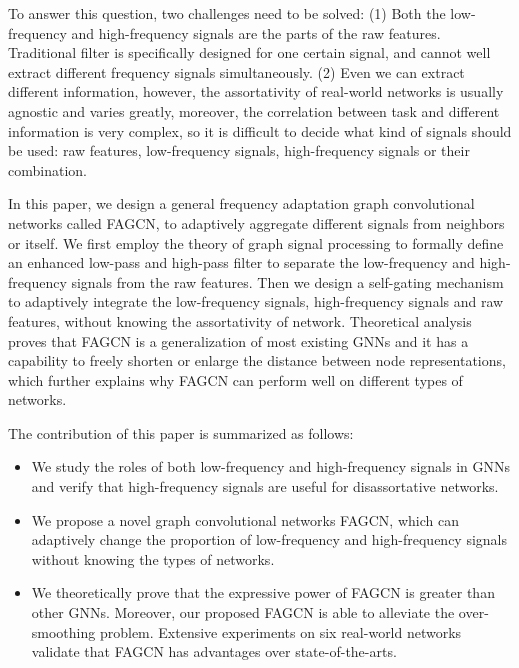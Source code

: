 \documentclass[letterpaper]{article} \usepackage{aaai21}  \usepackage{times}  \usepackage{helvet} \usepackage{courier}  \usepackage[hyphens]{url}  \usepackage{graphicx} \urlstyle{rm} \def\UrlFont{\rm}  \usepackage{natbib}  \usepackage{caption} \frenchspacing  \setlength{\pdfpagewidth}{8.5in}  \setlength{\pdfpageheight}{11in}
\begin{document}
To answer this question, two challenges need to be solved:
(1) Both the low-frequency and high-frequency signals are the parts of the raw features. Traditional filter is specifically designed for one certain signal, and cannot well extract different frequency signals  simultaneously.
(2) Even we can extract different information, however, the assortativity of real-world networks is usually agnostic and varies greatly, moreover, the correlation between task and different information is very complex, so it is difficult to decide what kind of signals should be used: raw features, low-frequency signals, high-frequency signals or their combination.

















In this paper, we design a general frequency adaptation graph convolutional networks called FAGCN, to adaptively aggregate different signals from neighbors or itself.
We first employ the theory of graph signal processing to formally define an enhanced low-pass and high-pass filter to separate the low-frequency and high-frequency signals from the raw features.
Then we design a self-gating mechanism to adaptively integrate the low-frequency signals, high-frequency signals and raw features, without knowing the assortativity of network. 
Theoretical analysis proves that FAGCN is a generalization of most existing GNNs and it has a capability to freely shorten or enlarge the distance between node representations, which further explains why FAGCN can perform well on different types of networks.









The contribution of this paper is summarized as follows:
\begin{itemize}
	\item We study the roles of both low-frequency and high-frequency signals in GNNs and verify that high-frequency signals are useful for disassortative networks.
	\item We propose a novel graph convolutional networks FAGCN, which can adaptively change the proportion of low-frequency and high-frequency signals without knowing the types of networks.
	\item We theoretically prove that the expressive power of FAGCN is greater than other GNNs. Moreover, our proposed FAGCN is able to alleviate the over-smoothing problem. Extensive experiments on six real-world networks validate that FAGCN has advantages over state-of-the-arts.
\end{itemize}
\end{document}
